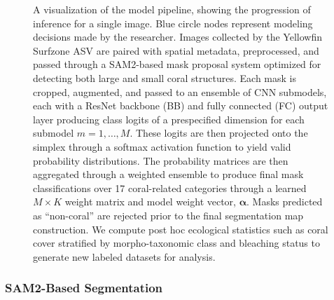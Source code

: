 \documentclass[11pt]{elsarticle}
\newcommand{\revadd}[1]{\textcolor{red}{#1}}
\begin{document}
\begin{figure}
    \centering
    \resizebox{0.9\textheight}{!}{%
        
    }
    \caption{A visualization of the model pipeline, showing the progression of inference for a single image. Blue circle nodes represent modeling decisions made by the researcher. Images collected by the Yellowfin Surfzone ASV are paired with spatial metadata, preprocessed, and passed through a SAM2-based mask proposal system optimized for detecting both large and small coral structures. Each mask is cropped, augmented, and passed to an ensemble of CNN submodels, each with a ResNet backbone (BB) and fully connected (FC) output layer producing class logits of a prespecified dimension for each submodel $m=1,\ldots,M$. These logits are then projected onto the simplex through a softmax activation function to yield valid probability distributions. The probability matrices are then aggregated through a weighted ensemble to produce final mask classifications over 17 coral-related categories through a learned $M\times K$ weight matrix and model weight vector, $\bm{\alpha}$. Masks predicted as ``non-coral'' are rejected prior to the final segmentation map construction. We compute post hoc ecological statistics such as coral cover stratified by morpho-taxonomic class and bleaching status to generate new labeled datasets for analysis.}
    \label{fig:pipeline}
\end{figure}

\subsubsection{SAM2-Based Segmentation}
\label{sec:sam2}
\end{document}
